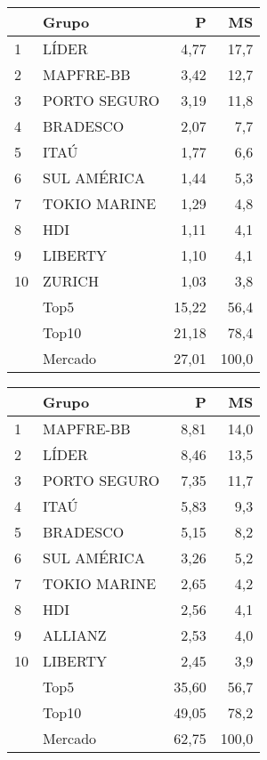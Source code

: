 \documentclass[../../relatorio.tex]{subfiles}
\begin{document}
\begin{table}[!h]
  \begin{minipage}[t]{0.49\linewidth}
    \centering
\begin{tabular}{llrr}
  \hline
 & Grupo & P & MS \\ 
  \hline
1 & LÍDER & 4,77 & 17,7 \\ 
  2 & MAPFRE-BB & 3,42 & 12,7 \\ 
  3 & PORTO SEGURO & 3,19 & 11,8 \\ 
  4 & BRADESCO & 2,07 & 7,7 \\ 
  5 & ITAÚ & 1,77 & 6,6 \\ 
  6 & SUL AMÉRICA & 1,44 & 5,3 \\ 
  7 & TOKIO MARINE & 1,29 & 4,8 \\ 
  8 & HDI & 1,11 & 4,1 \\ 
  9 & LIBERTY & 1,10 & 4,1 \\ 
  10 & ZURICH & 1,03 & 3,8 \\ 
   \hline
 & Top5 & 15,22 & 56,4 \\ 
   & Top10 & 21,18 & 78,4 \\ 
   & Mercado & 27,01 & 100,0 \\ 
   \hline
\end{tabular}    
  \end{minipage}
  \hspace{0.5cm}
  \begin{minipage}[t]{0.49\linewidth}
    \centering
\begin{tabular}{llrr}
  \hline
 & Grupo & P & MS \\ 
  \hline
1 & MAPFRE-BB & 8,81 & 14,0 \\ 
  2 & LÍDER & 8,46 & 13,5 \\ 
  3 & PORTO SEGURO & 7,35 & 11,7 \\ 
  4 & ITAÚ & 5,83 & 9,3 \\ 
  5 & BRADESCO & 5,15 & 8,2 \\ 
  6 & SUL AMÉRICA & 3,26 & 5,2 \\ 
  7 & TOKIO MARINE & 2,65 & 4,2 \\ 
  8 & HDI & 2,56 & 4,1 \\ 
  9 & ALLIANZ & 2,53 & 4,0 \\ 
  10 & LIBERTY & 2,45 & 3,9 \\ 
   \hline
 & Top5 & 35,60 & 56,7 \\ 
   & Top10 & 49,05 & 78,2 \\ 
   & Mercado & 62,75 & 100,0 \\ 
   \hline
\end{tabular}    
  \end{minipage}
\end{table}

\pagebreak
\end{document}

